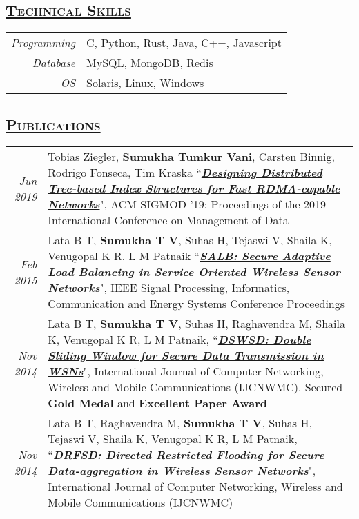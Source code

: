 \documentclass[14pt]{article}
\begin{document}
\subsection* {\scshape\Large\uline {Technical Skills}}
\begin{tabular}{r l}
\emph{Programming} & C, Python, Rust, Java, C++, Javascript \\
\emph{Database}	  & MySQL, MongoDB, Redis \\
\emph{OS} & Solaris, Linux, Windows
\end{tabular}

\subsection* {\scshape\Large\uline {Publications}}
\begin{tabularx}{\textwidth}{r X}
\emph{Jun 2019} & Tobias Ziegler, \textbf{Sumukha Tumkur Vani}, Carsten Binnig, Rodrigo Fonseca, Tim Kraska ``\textbf{\textit{\href{https://dl.acm.org/doi/10.1145/3299869.3300081}{Designing Distributed Tree-based Index Structures for Fast RDMA-capable Networks}}}", ACM SIGMOD '19: Proceedings of the 2019 International Conference on Management of Data \\
\emph{Feb 2015} & Lata B T, \textbf{Sumukha T V}, Suhas H, Tejaswi V, Shaila K, Venugopal K R, L M Patnaik ``\textbf{\textit{\href{http://ieeexplore.ieee.org/document/7091379/}{SALB: Secure Adaptive Load Balancing in Service Oriented Wireless Sensor Networks}}}",  IEEE Signal Processing, Informatics, Communication and Energy Systems Conference Proceedings \\
\emph{Nov 2014} & Lata B T, \textbf{Sumukha T V}, Suhas H, Raghavendra M, Shaila K, Venugopal K R, L M Patnaik, ``\textbf{\textit{\href{http://www.worldresearchlibrary.org/up_proc/pdf/2-141905888216-21.pdf}{DSWSD: Double Sliding Window for Secure Data Transmission in WSNs}}}", International Journal of Computer Networking, Wireless and Mobile Communications (IJCNWMC). Secured \textbf{Gold Medal} and \textbf{Excellent Paper Award} \\
\emph{Nov 2014} & Lata B T, Raghavendra M,  \textbf{Sumukha T V}, Suhas H, Tejaswi V, Shaila K, Venugopal K R, L M Patnaik, ``\textbf{\textit{\href{http://www.worldresearchlibrary.org/up_proc/pdf/2-141906057250-55.pdf}{DRFSD: Directed Restricted Flooding for Secure Data-aggregation in Wireless Sensor Networks}}}", International Journal of Computer Networking, Wireless and Mobile Communications (IJCNWMC)
\end{tabularx}
\end{document}
